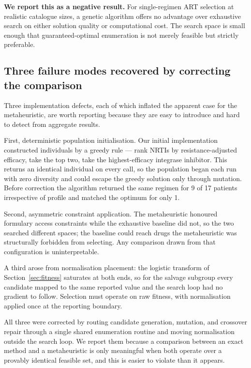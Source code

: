 \documentclass[conference]{IEEEtran}
\begin{document}
\textbf{We report this as a negative result.} For single-regimen ART selection at realistic catalogue sizes, a genetic algorithm offers no advantage over exhaustive search on either solution quality or computational cost. The search space is small enough that guaranteed-optimal enumeration is not merely feasible but strictly preferable.

\subsection{Three failure modes recovered by correcting the comparison}\label{sec:failures}

Three implementation defects, each of which inflated the apparent case for the metaheuristic, are worth reporting because they are easy to introduce and hard to detect from aggregate results.

First, deterministic population initialisation. Our initial implementation constructed individuals by a greedy rule --- rank NRTIs by resistance-adjusted efficacy, take the top two, take the highest-efficacy integrase inhibitor. This returns an identical individual on every call, so the population began each run with zero diversity and could escape the greedy solution only through mutation. Before correction the algorithm returned the same regimen for 9 of 17 patients irrespective of profile and matched the optimum for only 1.

Second, asymmetric constraint application. The metaheuristic honoured formulary access constraints while the exhaustive baseline did not, so the two searched different spaces; the baseline could reach drugs the metaheuristic was structurally forbidden from selecting. Any comparison drawn from that configuration is uninterpretable.

A third arose from normalisation placement: the logistic transform of Section~\ref{sec:fitness} saturates at both ends, so for the salvage subgroup every candidate mapped to the same reported value and the search loop had no gradient to follow. Selection must operate on raw fitness, with normalisation applied once at the reporting boundary.

All three were corrected by routing candidate generation, mutation, and crossover repair through a single shared enumeration routine and moving normalisation outside the search loop. We report them because a comparison between an exact method and a metaheuristic is only meaningful when both operate over a provably identical feasible set, and this is easier to violate than it appears.
\end{document}
